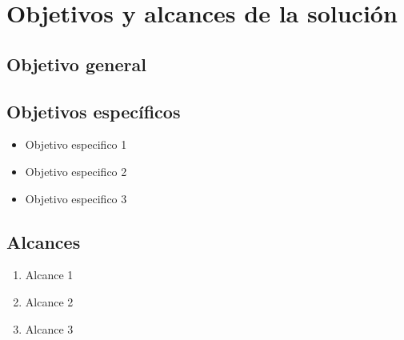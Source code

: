 \section{Objetivos y alcances de la solución}
\label{sec:objetivos}

\subsection{Objetivo general}
\label{subsec:objetivo-general}

\subsection{Objetivos específicos}
\label{subsec:objetivo-especificos}

\begin{itemize}
	\item Objetivo especifico 1
	\item Objetivo especifico 2
	\item Objetivo especifico 3
\end{itemize}

\subsection{Alcances}
\label{subsec:alcances}

\begin{enumerate}
	\item Alcance 1
	\item Alcance 2
	\item Alcance 3
\end{enumerate}